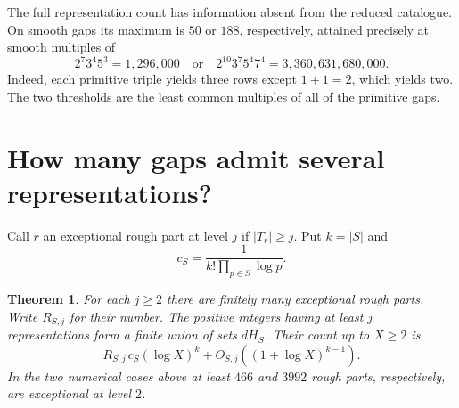 \documentclass[11pt,letterpaper]{article}
\newtheorem{theorem}{Theorem}
\newcommand{\Hs}{H_S}
\begin{document}
The full representation count has information absent from the reduced catalogue. On smooth gaps its maximum is $50$ or $188$, respectively, attained precisely at smooth multiples of
\[
 2^7 3^4 5^3=1{,}296{,}000
 \quad\text{or}\quad
 2^{10}3^7 5^4 7^4=3{,}360{,}631{,}680{,}000.
\]
Indeed, each primitive triple yields three rows except $1+1=2$, which yields two. The two thresholds are the least common multiples of all of the primitive gaps.

\section{How many gaps admit several representations?}
Call $r$ an exceptional rough part at level $j$ if $|T_r|\ge j$. Put $k=|S|$ and
\[
 c_S=\frac1{k!\prod_{p\in S}\log p}.
\]
\begin{theorem}\label{th:collision}
For each $j\ge2$ there are finitely many exceptional rough parts. Write $R_{S,j}$ for their number. The positive integers having at least $j$ representations form a finite union of sets $d\Hs$. Their count up to $X\ge2$ is
\[
 R_{S,j}\,c_S(\log X)^k+O_{S,j}((1+\log X)^{k-1}).
\]
In the two numerical cases above at least $466$ and $3992$ rough parts, respectively, are exceptional at level $2$.
\end{theorem}
\end{document}
